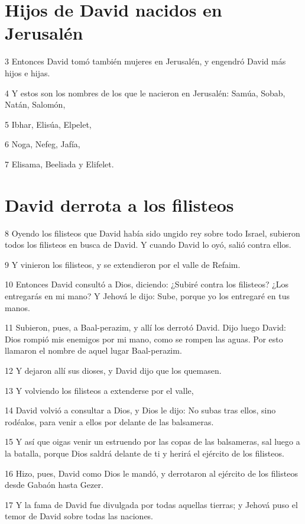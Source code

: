 \section*{Hijos de David nacidos en Jerusalén}

\par 3 Entonces David tomó también mujeres en Jerusalén, y engendró David más hijos e hijas.
\par 4 Y estos son los nombres de los que le nacieron en Jerusalén: Samúa, Sobab, Natán, Salomón,
\par 5 Ibhar, Elisúa, Elpelet,
\par 6 Noga, Nefeg, Jafía,
\par 7 Elisama, Beeliada y Elifelet.

\section*{David derrota a los filisteos}

\par 8 Oyendo los filisteos que David había sido ungido rey sobre todo Israel, subieron todos los filisteos en busca de David. Y cuando David lo oyó, salió contra ellos.
\par 9 Y vinieron los filisteos, y se extendieron por el valle de Refaim.
\par 10 Entonces David consultó a Dios, diciendo: ¿Subiré contra los filisteos? ¿Los entregarás en mi mano? Y Jehová le dijo: Sube, porque yo los entregaré en tus manos.
\par 11 Subieron, pues, a Baal-perazim, y allí los derrotó David. Dijo luego David: Dios rompió mis enemigos por mi mano, como se rompen las aguas. Por esto llamaron el nombre de aquel lugar Baal-perazim.
\par 12 Y dejaron allí sus dioses, y David dijo que los quemasen.
\par 13 Y volviendo los filisteos a extenderse por el valle,
\par 14 David volvió a consultar a Dios, y Dios le dijo: No subas tras ellos, sino rodéalos, para venir a ellos por delante de las balsameras.
\par 15 Y así que oigas venir un estruendo por las copas de las balsameras, sal luego a la batalla, porque Dios saldrá delante de ti y herirá el ejército de los filisteos.
\par 16 Hizo, pues, David como Dios le mandó, y derrotaron al ejército de los filisteos desde Gabaón hasta Gezer.
\par 17 Y la fama de David fue divulgada por todas aquellas tierras; y Jehová puso el temor de David sobre todas las naciones. 


